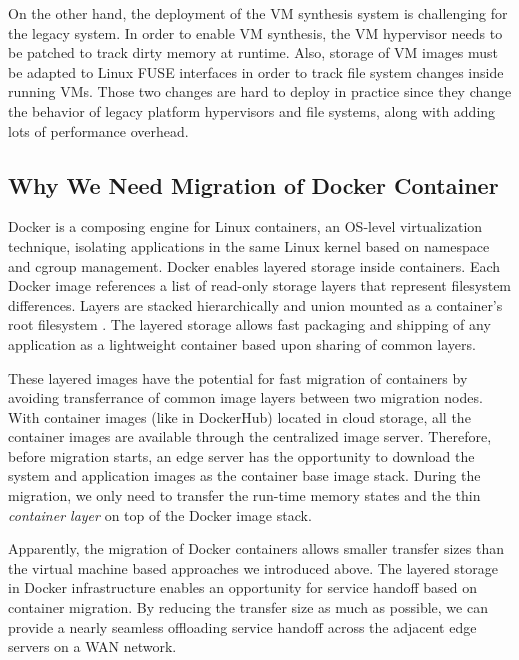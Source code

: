 On the other hand, the deployment of the VM synthesis system is challenging for the legacy system. In order to enable VM synthesis, the VM hypervisor needs to be patched to track dirty memory at runtime. Also, storage of VM images must be adapted to Linux FUSE interfaces in order to track file system changes inside running VMs. Those two changes are hard to deploy in practice since they change the behavior of legacy platform hypervisors and file systems, along with adding lots of performance overhead. 

\subsection{Why We Need Migration of Docker Container}
Docker 
is a composing engine for Linux containers, an OS-level virtualization technique, isolating applications in the same Linux kernel based on namespace and cgroup management. Docker enables layered storage inside containers.  Each Docker image references a list of read-only storage layers that represent filesystem differences. Layers are stacked hierarchically and union mounted as a container's root filesystem \cite{dockerlayer}. The layered storage allows fast packaging and shipping of any application as a lightweight container based upon sharing of common layers.

These layered images have the potential for fast migration of containers by avoiding transferrance of common image layers between two migration nodes. With container images (like in DockerHub) located in cloud storage, all the container images are available through the centralized image server. Therefore, before migration starts, an edge server has the opportunity to download the system and application images as the container base image stack. 
During the migration, we only need to transfer the run-time memory states and the thin \textit{container layer} on top of the Docker image stack. 

Apparently, the migration of Docker containers allows smaller transfer sizes than the virtual machine based approaches we introduced above. The layered storage in Docker infrastructure enables an opportunity for service handoff based on container migration. By reducing the transfer size as much as possible, we can provide a nearly seamless offloading service handoff across the adjacent edge servers on a WAN network.

